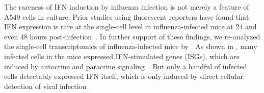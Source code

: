 \documentclass[9pt,lineno]{elife}
\begin{document}
The rareness of IFN induction by influenza infection is not merely a feature of A549 cells in culture.
Prior studies using fluorescent reporters have found that IFN expression is rare at the single-cell level in influenza-infected mice at 24 and even 48 hours post-infection~\citep{kallfass2013visualizing}.
In further support of these findings, we re-analyzed the single-cell transcriptomics of influenza-infected mice by \citet{steuerman2018dissection}.
As shown in , many infected cells in the mice expressed IFN-stimulated genes (ISGs), which are induced by autocrine and paracrine signaling~\citep{stetson2006type,honda2006type}.
But only a handful of infected cells detectably expressed IFN itself, which is only induced by direct cellular detection of viral infection~\citep{stetson2006type,honda2006type}.
\end{document}
